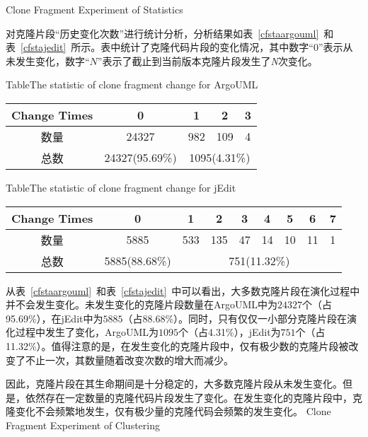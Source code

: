 {Clone Fragment Experiment of Statistics}

对克隆片段“历史变化次数”进行统计分析，分析结果如表~\ref{cfstaargouml}~和表~\ref{cfstajedit}~所示。表中统计了克隆代码片段的变化情况，其中数字“$0$”表示从未发生变化，数字“$N$”表示了截止到当前版本克隆片段发生了{\emph N\/}次变化。

\begin{table}[htbp]
{Table$\!$}{The statistic of clone fragment change for ArgoUML}
\vspace{0.5em}
\centering
\wuhao
\begin{tabular}{ccccc}
\toprule[1.5pt]
Change Times&0&1&2&3\\ 
\midrule[1pt]
数量&24327&982&109&4\\ 
\cline{3-5}
总数&24327(95.69\%)&\multicolumn{3}{c}{1095(4.31\%)} \\
\bottomrule[1.5pt]
\end{tabular}
\end{table}

\begin{table}[htbp]
{Table$\!$}{The statistic of clone fragment change for jEdit}
\vspace{0.5em}
\centering
\wuhao
\begin{tabular}{ccccccccc}
\toprule[1.5pt]
Change Times &0&1&2&3&4&5&6&7\\ 
\midrule[1pt]
数量&5885&533&135&47&14&10&11&1\\ 
\cline{3-9}
总数&5885(88.68\%)&\multicolumn{7}{c}{751(11.32\%)}   \\ 
\bottomrule[1.5pt]
\end{tabular}
\end{table}

从表~\ref{cfstaargouml}~和表~\ref{cfstajedit}~中可以看出，大多数克隆片段在演化过程中并不会发生变化。未发生变化的克隆片段数量在ArgoUML中为$24327$个（占95.69\%），在jEdit中为$5885$（占88.68\%）。同时，只有仅仅一小部分克隆片段在演化过程中发生了变化，ArgoUML为$1095$个（占4.31\%），jEdit为$751$个（占11.32\%）。值得注意的是，在发生变化的克隆片段中，仅有极少数的克隆片段被改变了不止一次，其数量随着改变次数的增大而减少。

 因此，克隆片段在其生命期间是十分稳定的，大多数克隆片段从未发生变化。但是，依然存在一定数量的克隆代码片段发生了变化。在发生变化的克隆片段中，克隆变化不会频繁地发生，仅有极少量的克隆代码会频繁的发生变化。
{Clone Fragment Experiment of Clustering}

